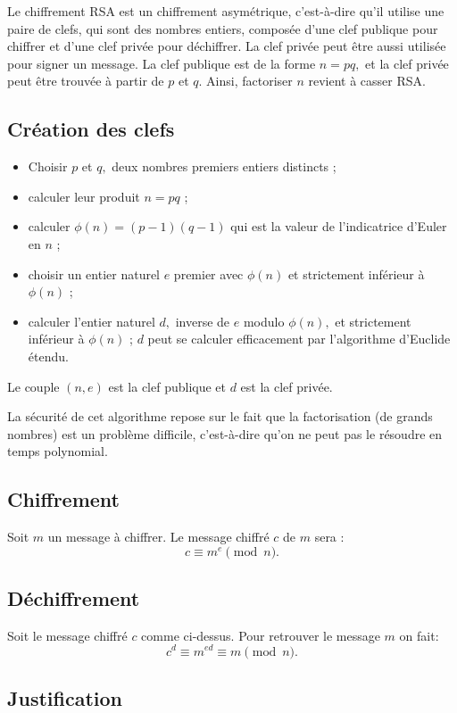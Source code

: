 \documentclass[french, 12pt, titlepage]{article}
\newenvironment{itemH}[0]{\begin{itemize}[label=$\bullet$, font=\color{black} \large]}{\end{itemize}}
\begin{document}
Le chiffrement RSA est un chiffrement asymétrique, c'est-à-dire qu'il utilise une paire de clefs, qui sont des nombres entiers, composée d'une clef publique pour chiffrer et d'une clef privée pour déchiffrer.
La clef privée peut être aussi utilisée pour signer un message. La clef publique est de la forme $n = pq,$ et la clef privée peut être trouvée à partir de $p$ et $q.$ Ainsi, factoriser $n$ revient à casser RSA.

\subsection{Création des clefs}

\begin{itemH}
\item Choisir $p$ et $q,$ deux nombres premiers entiers distincts ;
\item calculer leur produit $n = pq$ ;
\item calculer $\phi (n) = (p - 1)(q - 1)$ qui est la valeur de l'indicatrice d'Euler en $n$ ;
\item choisir un entier naturel $e$ premier avec $\phi (n)$ et strictement inférieur à $\phi (n)$ ;
\item calculer l'entier naturel $d,$ inverse de $e$ modulo $ \phi (n),$ et strictement inférieur à $\phi (n)$ ; $d$ peut se calculer efficacement par l'algorithme d'Euclide étendu.
\end{itemH}

Le couple $(n, e)$ est la clef publique et $d$ est la clef privée.

La sécurité de cet algorithme repose sur le fait que la factorisation (de grands nombres) est un problème difficile, c'est-à-dire qu'on ne peut pas le résoudre en temps polynomial.

\subsection{Chiffrement}
Soit $m$ un message à chiffrer. Le message chiffré $c$ de $m$ sera :
\[ c \equiv m^e \pmod n .\]
\subsection{Déchiffrement}

Soit le message chiffré $c$ comme ci-dessus. Pour retrouver le message $m$ on fait:
\[ c^d \equiv m^{ed} \equiv m \pmod n.\]

\subsection{Justification}
\end{document}
